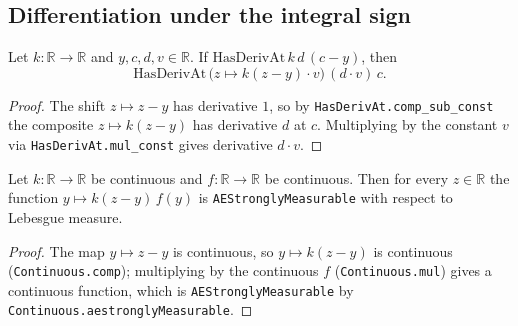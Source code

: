\subsection{Differentiation under the integral sign}

\begin{lemma}
    \label{lem:shift_scale_hasDerivAt}
    \leanok
    Let $k : \mathbb{R} \to \mathbb{R}$ and $y, c, d, v \in \mathbb{R}$. If
    $\mathrm{HasDerivAt}\,k\,d\,(c-y)$, then
    \[ \mathrm{HasDerivAt}\,\bigl(z \mapsto k(z-y)\cdot v\bigr)\,(d\cdot v)\,c. \]
\end{lemma}
\begin{proof}
    The shift $z \mapsto z - y$ has derivative $1$, so by
    \texttt{HasDerivAt.comp\_sub\_const} the composite $z \mapsto k(z-y)$ has
    derivative $d$ at $c$. Multiplying by the constant $v$ via
    \texttt{HasDerivAt.mul\_const} gives derivative $d\cdot v$.
\end{proof}

\begin{lemma}
    \label{lem:shift_scale_aestronglyMeasurable}
    \leanok
    Let $k : \mathbb{R} \to \mathbb{R}$ be continuous and $f : \mathbb{R} \to \mathbb{R}$
    be continuous. Then for every $z \in \mathbb{R}$ the function
    $y \mapsto k(z-y)\, f(y)$ is \texttt{AEStronglyMeasurable} with respect to Lebesgue
    measure.
\end{lemma}
\begin{proof}
    The map $y \mapsto z - y$ is continuous, so $y \mapsto k(z-y)$ is continuous
    (\texttt{Continuous.comp}); multiplying by the continuous $f$
    (\texttt{Continuous.mul}) gives a continuous function, which is
    \texttt{AEStronglyMeasurable} by \texttt{Continuous.aestronglyMeasurable}.
\end{proof}

